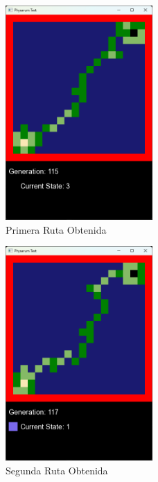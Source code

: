     \begin{figure}[htbp]
        \centering
        \includegraphics[width=0.5\textwidth]{./images/Pruebas/simulador/image011.png}
        \caption{Primera Ruta Obtenida}
        \label{fig:Ruta 2}
    \end{figure}
    \vskip 0.5cm
    \begin{figure}[htbp]
        \centering
        \includegraphics[width=0.5\textwidth]{./images/Pruebas/simulador/image013.png}
        \caption{Segunda Ruta Obtenida}
        \label{fig:Ruta 3}
    \end{figure}
    \vskip 0.5cm
